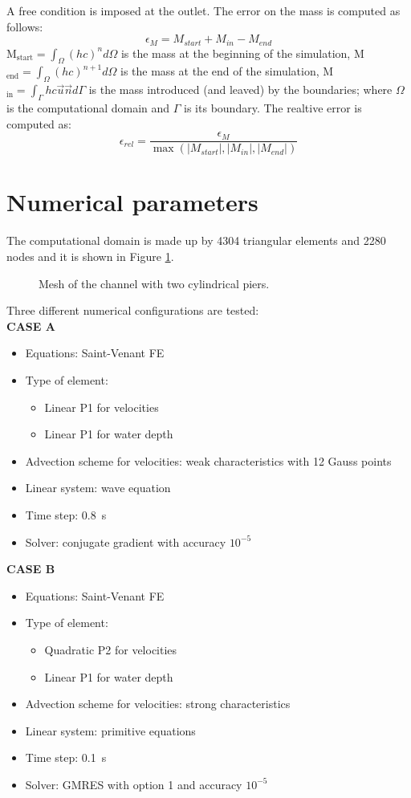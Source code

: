A free condition is imposed at the outlet. The error on the mass is computed as follows:
\begin{equation*}
  \epsilon_{M}= M_{start}+M_{in}-M_{end}
\end{equation*}
M$_{\text{start}}=\int_{\Omega}(hc)^nd\Omega$ is the mass at the beginning of the simulation,  M$_{\text{end}}=\int_{\Omega}(hc)^{n+1}d\Omega$ is the mass at the end of the simulation, M$_{\text{in}}=\int_{\Gamma}hc\vec{u}\vec{n}d\Gamma$ is the mass introduced (and leaved) by the boundaries; where $\Omega$ is the computational domain and $\Gamma$ is its boundary.
The realtive error is computed as:
\begin{equation*}
  \epsilon_{rel}=\frac{\epsilon_{M}}{\max(|M_{start}|,|M_{in}|,|M_{end}|)}
\end{equation*}
\section{Numerical parameters}
The computational domain is made up by 4304 triangular elements and 2280 nodes and it is shown in Figure \ref{fig:mesh:bridge}.
\begin{figure}[H]
 \centering
 \caption{Mesh of the channel with two cylindrical piers.}
 \label{fig:mesh:bridge}
\end{figure}
Three different numerical configurations are tested: \\
\textbf{CASE A}
\begin{itemize}
 \item Equations: Saint-Venant FE
 \item Type of element:
 \begin{itemize}
  \item Linear P1 for velocities
  \item Linear P1 for water depth
 \end{itemize}
 \item Advection scheme for velocities: weak characteristics with 12 Gauss points
 \item Linear system: wave equation
 \item Time step: 0.8~s
 \item Solver: conjugate gradient with accuracy $10^{-5}$
\end{itemize}
\textbf{CASE B}
\begin{itemize}
 \item Equations: Saint-Venant FE
 \item Type of element:
 \begin{itemize}
  \item Quadratic P2 for velocities
  \item Linear P1 for water depth
 \end{itemize}
 \item Advection scheme for velocities: strong characteristics
 \item Linear system: primitive equations
 \item Time step: 0.1~s
 \item Solver: GMRES with option 1 and accuracy $10^{-5}$
\end{itemize}
